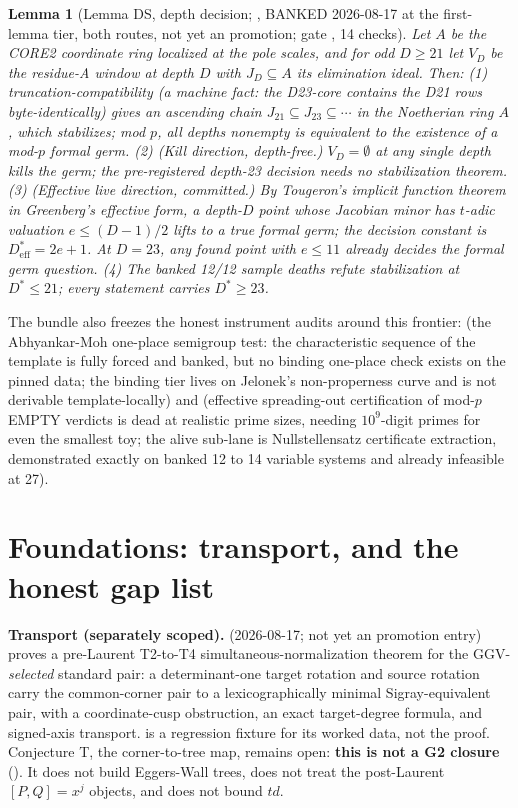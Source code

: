 \documentclass[11pt]{article}
\newtheorem{lemma}[theorem]{Lemma}
\theoremstyle{definition}
\theoremstyle{remark}
\begin{document}
\begin{lemma}[Lemma DS, depth decision; , BANKED
2026-08-17 at the first-lemma tier, both routes, not yet an 
promotion; gate , 14 checks]
Let $A$ be the CORE2 coordinate ring localized at the pole scales, and for
odd $D\ge 21$ let $V_D$ be the residue-A window at depth $D$ with
$J_D\subseteq A$ its elimination ideal. Then:
(1) truncation-compatibility (a machine fact: the D23-core contains the
D21 rows byte-identically) gives an ascending chain
$J_{21}\subseteq J_{23}\subseteq\cdots$ in the Noetherian ring $A$, which
stabilizes; mod $p$, all depths nonempty is equivalent to the existence of
a mod-$p$ formal germ.
(2) (Kill direction, depth-free.) $V_D=\emptyset$ at any single depth kills
the germ; the pre-registered depth-23 decision needs no stabilization
theorem.
(3) (Effective live direction, committed.) By Tougeron's implicit function
theorem in Greenberg's effective form, a depth-$D$ point whose Jacobian
minor has $t$-adic valuation $e\le (D-1)/2$ lifts to a true formal germ;
the decision constant is $D^*_{\mathrm{eff}}=2e+1$. At $D=23$, any found
point with $e\le 11$ already decides the formal germ question.
(4) The banked 12/12 sample deaths refute stabilization at $D^*\le 21$;
every statement carries $D^*\ge 23$.
\end{lemma}

The bundle also freezes the honest instrument audits around this frontier:
 (the Abhyankar-Moh one-place semigroup test: the
characteristic sequence of the template is fully forced and banked, but no
binding one-place check exists on the pinned data; the binding tier lives
on Jelonek's non-properness curve and is not derivable template-locally)
and  (effective spreading-out certification of mod-$p$
EMPTY verdicts is dead at realistic prime sizes, needing $10^{9}$-digit
primes for even the smallest toy; the alive sub-lane is Nullstellensatz
certificate extraction, demonstrated exactly on banked 12 to 14 variable
systems and already infeasible at 27).

\section{Foundations: transport, and the honest gap list}\label{sec:foundations}

\textbf{Transport (separately scoped).}  (2026-08-17;
not yet an  promotion entry) proves a pre-Laurent T2-to-T4
simultaneous-normalization theorem for the GGV-\emph{selected} standard
pair: a determinant-one target rotation and source rotation carry the
common-corner pair to a lexicographically minimal Sigray-equivalent pair,
with a coordinate-cusp obstruction, an exact target-degree formula, and
signed-axis transport.  is a regression
fixture for its worked data, not the proof. Conjecture T, the
corner-to-tree map, remains open: \textbf{this is not a G2 closure}
(). It does not build Eggers-Wall
trees, does not treat the post-Laurent $[P,Q]=x^j$ objects, and does not
bound $td$.
\end{document}

